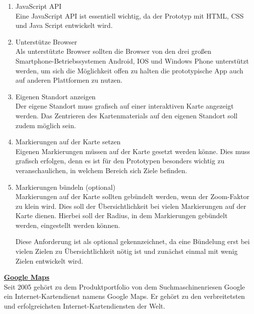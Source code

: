 \begin{enumerate}
\item JavaScript API\\
Eine JavaScript API ist essentiell wichtig, da der Prototyp mit HTML, CSS und Java Script entwickelt wird. 

\item Unterstütze Browser\\
Als unterstützte Browser sollten die Browser von den drei großen Smartphone-Betriebssystemen Android, IOS und Windows Phone unterstützt werden, um sich die Möglichkeit offen zu halten die prototypische App auch auf anderen Plattformen zu nutzen.

\item Eigenen Standort anzeigen\\

Der eigene Standort muss grafisch auf einer interaktiven Karte angezeigt werden. Das Zentrieren des Kartenmaterials auf den eigenen Standort soll zudem möglich sein.

\item Markierungen auf der Karte setzen\\
Eigenen Markierungen müssen auf der Karte gesetzt werden könne. Dies muss grafisch erfolgen, denn es ist für den Prototypen besonders wichtig zu veranschaulichen, in welchem Bereich sich Ziele befinden. 

\item Markierungen bündeln (optional)\\
Markierungen auf der Karte sollten gebündelt werden, wenn der Zoom-Faktor zu klein wird. Dies soll der Übersichtlichkeit bei vielen Markierungen auf der Karte dienen. Hierbei soll der Radius, in dem Markierungen gebündelt werden, eingestellt werden können.

Diese Anforderung ist als optional gekennzeichnet, da eine Bündelung erst bei vielen Zielen zu Übersichtlichkeit nötig ist und zunächst einmal mit wenig Zielen entwickelt wird.

\end{enumerate}



\textbf{\underline{Google Maps}}\\

Seit 2005 gehört zu dem Produktportfolio von dem Suchmaschinenriesen Google ein Internet-Kartendienst namens Google Maps. 
Er gehört zu den verbreitetsten und erfolgreichsten Internet-Kartendiensten der Welt. \cite[Lexikon Google Maps]{itwissen}\cite[S.88]{gruber2015}

